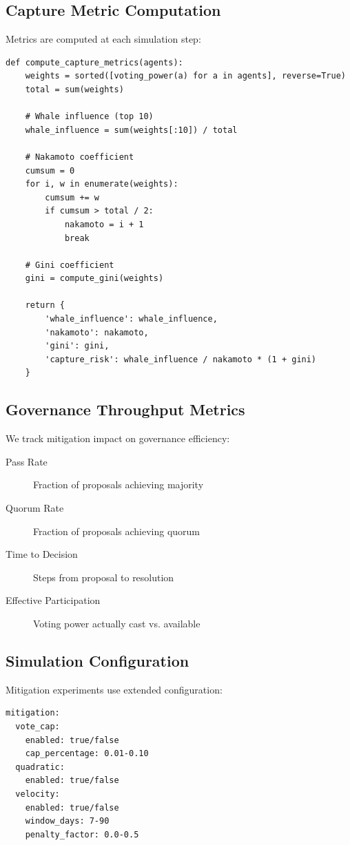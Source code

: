 \subsection{Capture Metric Computation}

Metrics are computed at each simulation step:

\begin{lstlisting}[caption=Capture metrics computation]
def compute_capture_metrics(agents):
    weights = sorted([voting_power(a) for a in agents], reverse=True)
    total = sum(weights)

    # Whale influence (top 10)
    whale_influence = sum(weights[:10]) / total

    # Nakamoto coefficient
    cumsum = 0
    for i, w in enumerate(weights):
        cumsum += w
        if cumsum > total / 2:
            nakamoto = i + 1
            break

    # Gini coefficient
    gini = compute_gini(weights)

    return {
        'whale_influence': whale_influence,
        'nakamoto': nakamoto,
        'gini': gini,
        'capture_risk': whale_influence / nakamoto * (1 + gini)
    }
\end{lstlisting}

\subsection{Governance Throughput Metrics}

We track mitigation impact on governance efficiency:

\begin{description}
    \item[Pass Rate] Fraction of proposals achieving majority
    \item[Quorum Rate] Fraction of proposals achieving quorum
    \item[Time to Decision] Steps from proposal to resolution
    \item[Effective Participation] Voting power actually cast vs. available
\end{description}

\subsection{Simulation Configuration}

Mitigation experiments use extended configuration:

\begin{lstlisting}[caption=Mitigation configuration schema]
mitigation:
  vote_cap:
    enabled: true/false
    cap_percentage: 0.01-0.10
  quadratic:
    enabled: true/false
  velocity:
    enabled: true/false
    window_days: 7-90
    penalty_factor: 0.0-0.5
\end{lstlisting}
